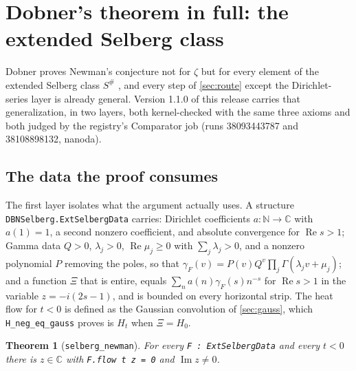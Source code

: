\documentclass[11pt]{article}
\newtheorem{theorem}{Theorem}
\theoremstyle{definition}
\newcommand{\lean}[1]{\texttt{#1}}
\newcommand{\Hfun}{H}
\newcommand{\re}{\operatorname{Re}}
\newcommand{\im}{\operatorname{Im}}
\newcommand{\C}{\mathbb{C}}
\newcommand{\N}{\mathbb{N}}
\begin{document}
\section{Dobner's theorem in full: the extended Selberg class}\label{sec:selberg}

Dobner proves Newman's conjecture not for $\zeta$ but for every element of the extended Selberg class $S^\#$ \cite{Do}, and every step of \cref{sec:route} except the Dirichlet-series layer is already general. Version 1.1.0 of this release carries that generalization, in two layers, both kernel-checked with the same three axioms and both judged by the registry's Comparator job (runs 38093443787 and 38108898132, nanoda).

\subsection{The data the proof consumes}

The first layer isolates what the argument actually uses. A structure \lean{DBNSelberg.ExtSelbergData} carries: Dirichlet coefficients $a : \N \to \C$ with $a(1) = 1$, a second nonzero coefficient, and absolute convergence for $\re s > 1$; Gamma data $Q > 0$, $\lambda_j > 0$, $\re\mu_j \ge 0$ with $\sum_j\lambda_j > 0$, and a nonzero polynomial $P$ removing the poles, so that $\gamma_F(v) = P(v)Q^v\prod_j\Gamma(\lambda_j v + \mu_j)$; and a function $\Xi$ that is entire, equals $\sum_n a(n)\gamma_F(s)n^{-s}$ for $\re s > 1$ in the variable $z = -i(2s-1)$, and is bounded on every horizontal strip. The heat flow for $t<0$ is defined as the Gaussian convolution of \cref{sec:gauss}, which \lean{H\_neg\_eq\_gauss} proves is $\Hfun_t$ when $\Xi = \Hfun_0$.

\begin{theorem}[\lean{selberg\_newman}]
For every \lean{F : ExtSelbergData} and every $t<0$ there is $z\in\C$ with \lean{F.flow t z = 0} and $\im z \ne 0$.
\end{theorem}
\end{document}
